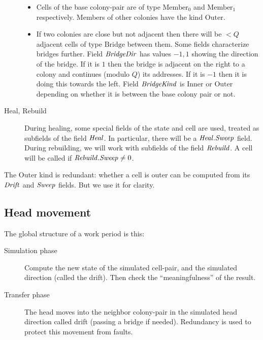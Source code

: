 \documentclass[11pt]{memoir}
\theoremstyle{definition} %
\newcommand{\fld}[1]{\ensuremath{\textit{#1\/}}}
\newcommand{\Q}{Q} %
\newcommand{\BridgeDir}{\fld{BridgeDir}}
\newcommand{\BridgeKind}{\fld{BridgeKind}}
\newcommand{\Drift}{\fld{Drift}}
\newcommand{\Heal}{\fld{Heal}} %
\newcommand{\Rebuild}{\fld{Rebuild}} %
\newcommand{\Sweep}{\fld{Sweep}} %
\newcommand{\Bridge}{\mathrm{Bridge}}
\newcommand{\Inner}{\mathrm{Inner}}
\newcommand{\Member}{\mathrm{Member}}
\newcommand{\Outer}{\mathrm{Outer}}
\begin{document}
\begin{description}
\begin{itemize}
\item Cells of the base colony-pair are of type \( \Member_{0} \) and \( \Member_{1} \) respectively.
  Members of other colonies have the kind \( \Outer \).

\item If two colonies are close but not adjacent then there will be \( <\Q \)
adjacent cells of type \( \Bridge \) between them.
Some fields characterize bridges further.
Field \( \BridgeDir \) has values \( -1,1 \) showing the direction of the bridge.
If it is \( 1 \) then the bridge is adjacent on the right to a colony and continues (modulo \( \Q \))
its addresses.
If it is \( -1 \) then it is doing this towards the left.
Field \( \BridgeKind \) is \( \Inner \) or \( \Outer \) depending on whether it is between the base colony pair
or not.

\end{itemize}

\item[Heal, Rebuild] During healing, some special fields of the state and cell are used,
  treated as subfields of the field \( \Heal \).
In particular, there will be a \( \Heal.\Sweep \) field.
During rebuilding, we will work with subfields of the field \( \Rebuild \).
A cell will be called  if \( \Rebuild.\Sweep\ne 0 \).

\end{description}

\begin{remark}
  The \( \Outer \) kind is redundant:
  whether a cell is outer can be computed from its \( \Drift \) and \( \Sweep \) fields.
  But we use it for clarity.
\end{remark}

\subsection{Head movement}\label{sec:sweep}

The global structure of a work period is this:
\begin{description}

\item[Simulation phase]
Compute the new state of the simulated cell-pair, and the simulated direction (called the drift).
Then check the ``meaningfulness'' of the result.

\item[Transfer phase]
  The head moves into the neighbor colony-pair
  in the simulated head direction called drift (passing a bridge if needed).
  Redundancy is used to protect this movement from faults.
\end{description}
\end{document}
